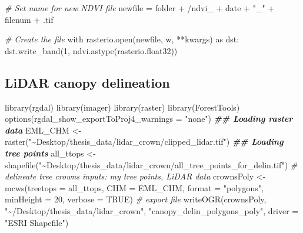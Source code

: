 \documentclass[12pt,twoside]{reedthesis}
\newenvironment{Shaded}{\begin{snugshade}}{\end{snugshade}}
\newcommand{\AttributeTok}[1]{\textcolor[rgb]{0.77,0.63,0.00}{#1}}
\newcommand{\CommentTok}[1]{\textcolor[rgb]{0.56,0.35,0.01}{\textit{#1}}}
\newcommand{\ConstantTok}[1]{\textcolor[rgb]{0.00,0.00,0.00}{#1}}
\newcommand{\DecValTok}[1]{\textcolor[rgb]{0.00,0.00,0.81}{#1}}
\newcommand{\DocumentationTok}[1]{\textcolor[rgb]{0.56,0.35,0.01}{\textbf{\textit{#1}}}}
\newcommand{\FunctionTok}[1]{\textcolor[rgb]{0.00,0.00,0.00}{#1}}
\newcommand{\NormalTok}[1]{#1}
\newcommand{\OtherTok}[1]{\textcolor[rgb]{0.56,0.35,0.01}{#1}}
\newcommand{\SpecialCharTok}[1]{\textcolor[rgb]{0.00,0.00,0.00}{#1}}
\newcommand{\StringTok}[1]{\textcolor[rgb]{0.31,0.60,0.02}{#1}}
\begin{document}
\begin{Shaded}
\begin{Highlighting}[]
    \CommentTok{\# Set name for new NDVI file}
\NormalTok{    newfile }\OtherTok{=}\NormalTok{ folder }\SpecialCharTok{+} \StringTok{\textquotesingle{}/ndvi\_\textquotesingle{}} \SpecialCharTok{+}\NormalTok{ date }\SpecialCharTok{+} \StringTok{"\_"} \SpecialCharTok{+}\NormalTok{ filenum }\SpecialCharTok{+} \StringTok{\textquotesingle{}.tif\textquotesingle{}}

    \CommentTok{\# Create the file}
\NormalTok{    with }\FunctionTok{rasterio.open}\NormalTok{(newfile, }\StringTok{\textquotesingle{}w\textquotesingle{}}\NormalTok{, }\SpecialCharTok{**}\NormalTok{kwargs) as dst}\SpecialCharTok{:}
        \FunctionTok{dst.write\_band}\NormalTok{(}\DecValTok{1}\NormalTok{, }\FunctionTok{ndvi.astype}\NormalTok{(rasterio.float32))}
\end{Highlighting}
\end{Shaded}
\normalsize

\hypertarget{lidar-canopy-delineation}{%
\subsection*{LiDAR canopy delineation}\label{lidar-canopy-delineation}}

\footnotesize
\begin{Shaded}
\begin{Highlighting}[]
\FunctionTok{library}\NormalTok{(rgdal)}
\FunctionTok{library}\NormalTok{(imager)}
\FunctionTok{library}\NormalTok{(raster)}
\FunctionTok{library}\NormalTok{(ForestTools)}
\FunctionTok{options}\NormalTok{(}\AttributeTok{rgdal\_show\_exportToProj4\_warnings =} \StringTok{"none"}\NormalTok{)}
\DocumentationTok{\#\# Loading raster data}
\NormalTok{EML\_CHM }\OtherTok{\textless{}{-}} \FunctionTok{raster}\NormalTok{(}\StringTok{"\textasciitilde{}Desktop/thesis\_data/lidar\_crown/clipped\_lidar.tif"}\NormalTok{)}
\DocumentationTok{\#\# Loading tree points}
\NormalTok{all\_ttops }\OtherTok{\textless{}{-}} \FunctionTok{shapefile}\NormalTok{(}\StringTok{"\textasciitilde{}Desktop/thesis\_data/lidar\_crown/all\_tree\_points\_for\_delin.tif"}\NormalTok{)}
\CommentTok{\# delineate tree crowns inputs: my tree points, LiDAR data}
\NormalTok{crownsPoly }\OtherTok{\textless{}{-}} \FunctionTok{mcws}\NormalTok{(}\AttributeTok{treetops =}\NormalTok{ all\_ttops, }\AttributeTok{CHM =}\NormalTok{ EML\_CHM, }\AttributeTok{format =} \StringTok{"polygons"}\NormalTok{,}
    \AttributeTok{minHeight =} \DecValTok{20}\NormalTok{, }\AttributeTok{verbose =} \ConstantTok{TRUE}\NormalTok{)}
\CommentTok{\# export file}
\FunctionTok{writeOGR}\NormalTok{(crownsPoly, }\StringTok{"\textasciitilde{}/Desktop/thesis\_data/lidar\_crown"}\NormalTok{, }\StringTok{"canopy\_delin\_polygons\_poly"}\NormalTok{,}
    \AttributeTok{driver =} \StringTok{"ESRI Shapefile"}\NormalTok{)}
\end{Highlighting}
\end{Shaded}
\normalsize
\end{document}

